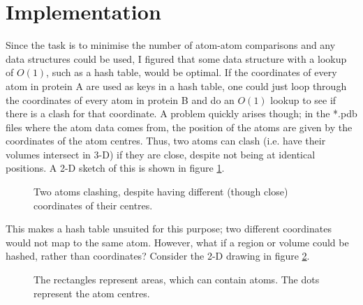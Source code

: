 \documentclass[a4paper]{article}
\begin{document}
\section*{Implementation}
Since the task is to minimise the number of atom-atom comparisons and any data structures could be used, I figured that some data structure with a lookup of $O(1)$, such as a hash table, would be optimal. If the coordinates of every atom in protein A are used as keys in a hash table, one could just loop through the coordinates of every atom in protein B and do an $O(1)$ lookup to see if there is a clash for that coordinate. A problem quickly arises though; in the *.pdb files where the atom data comes from, the position of the atoms are given by the coordinates of the atom centres. Thus, two atoms can clash (i.e. have their volumes intersect in 3-D) if they are close, despite not being at identical positions. A 2-D sketch of this is shown in figure \ref{fig:atomsintersect}.

\begin{figure}[H]
\centering
{}
\caption{Two atoms clashing, despite having different (though close) coordinates of their centres.}
\label{fig:atomsintersect}
\end{figure}

This makes a hash table unsuited for this purpose; two different coordinates would not map to the same atom. However, what if a region or volume could be hashed, rather than coordinates? Consider the 2-D drawing in figure \ref{fig:2dregionsmall}.

\begin{figure}[H]
\centering
{}
\caption{The rectangles represent areas, which can contain atoms. The dots represent the atom centres.}
\label{fig:2dregionsmall}
\end{figure}
\end{document}
